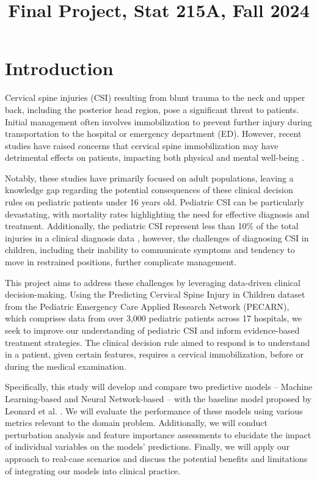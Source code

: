 \documentclass[10pt,letterpaper]{article}
\title{Final Project, Stat 215A, Fall 2024\vspace{-2em}}
\begin{document}
\maketitle

\section{Introduction}

Cervical spine injuries (CSI) resulting from blunt trauma to the neck and upper back, including the posterior head region, pose a significant threat to patients. Initial management often involves immobilization to prevent further injury during transportation to the hospital or emergency department (ED). However, recent studies have raised concerns that cervical spine immobilization may have detrimental effects on patients, impacting both physical and mental well-being \cite{ham2014pressure, abram2010routine, ottosen2019patient}.

Notably, these studies have primarily focused on adult populations, leaving a knowledge gap regarding the potential consequences of these clinical decision rules on pediatric patients under 16 years old. Pediatric CSI can be particularly devastating, with mortality rates highlighting the need for effective diagnosis and treatment. Additionally, the pediatric CSI represent less than 10\% of the total injuries in a clinical diagnosis data \cite{brown2001cervical}, however, the challenges of diagnosing CSI in children, including their inability to communicate symptoms and tendency to move in restrained positions, further complicate management.

This project aims to address these challenges by leveraging data-driven clinical decision-making. Using the Predicting Cervical Spine Injury in Children dataset from the Pediatric Emergency Care Applied Research Network (PECARN), which comprises data from over 3,000 pediatric patients across 17 hospitals, we seek to improve our understanding of pediatric CSI and inform evidence-based treatment strategies. The clinical decision rule aimed to respond is to understand in a patient, given certain features, requires a cervical immobilization, before or during the medical examination.

Specifically, this study will develop and compare two predictive models – Machine Learning-based and Neural Network-based – with the baseline model proposed by Leonard et al. \cite{leonard2011factors}. We will evaluate the performance of these models using various metrics relevant to the domain problem. Additionally, we will conduct perturbation analysis and feature importance assessments to elucidate the impact of individual variables on the models' predictions. Finally, we will apply our approach to real-case scenarios and discuss the potential benefits and limitations of integrating our models into clinical practice.
\end{document}
